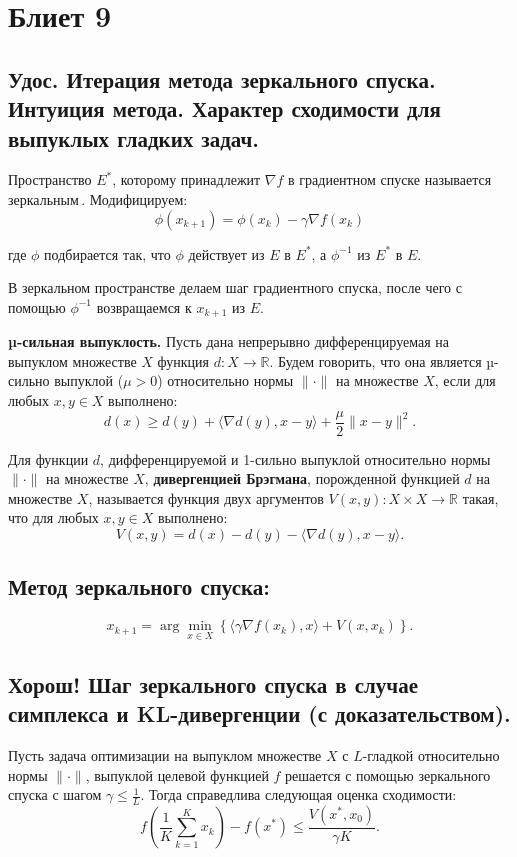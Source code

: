\section{Блиет 9}

\subsection{Удос. Итерация метода зеркального спуска. Интуиция метода. Характер сходимости для выпуклых гладких задач.}

\begin{definition}
    Пространство $E^*$, которому принадлежит $\nabla f$ в градиентном спуске называется \guillemetleft зеркальным\guillemetright \,. Модифицируем:
    $$\phi(x_{k+1}) = \phi(x_k) - \gamma \nabla f(x_k)$$
\end{definition}
где $\phi$ подбирается так, что $\phi$ действует из $E$ в $E^*$, а $\phi^{-1}$ из $E^*$ в $E$.

В зеркальном пространстве делаем шаг градиентного спуска,
после чего с помощью $\phi^{-1}$ возвращаемся к $x_{k+1}$ из $E$.

\begin{definition}
    \textbf{µ-сильная выпуклость.} Пусть дана непрерывно дифференцируемая на выпуклом множестве \( X \) функция
    \( d : X \to \mathbb{R} \). Будем говорить, что она является µ-сильно выпуклой (\( \mu > 0 \)) относительно нормы \( \| \cdot \| \) на множестве \( X \), если для любых \( x, y \in X \) выполнено:
    $$d(x) \geq d(y) + \langle \nabla d(y), x - y \rangle + \frac{\mu}{2} \| x - y \|^2.$$
\end{definition}

\begin{definition}
    Для функции $d$, дифференцируемой и 1-сильно выпуклой относительно нормы $\| \cdot \|$ на множестве $X$,
    \textbf{дивергенцией Брэгмана}, порожденной функцией $d$ на множестве $X$,
    называется функция двух аргументов $V(x, y) : X \times X \to \mathbb{R}$ такая, что для любых $x, y \in X$ выполнено:
    $$V(x, y) = d(x) - d(y) - \langle \nabla d(y), x - y \rangle.$$
\end{definition}

\subsection*{Метод зеркального спуска:}
$$x_{k+1} = \arg \min_{x \in X} \left\{ \langle \gamma \nabla f(x_k), x \rangle + V(x, x_k) \right\}.$$

\subsection{Хорош! Шаг зеркального спуска в случае
    симплекса и KL-дивергенции (с доказательством).}

\begin{theorem}
    Пусть задача оптимизации на выпуклом множестве $X$ с $L$-гладкой относительно нормы $\| \cdot \|$,
    выпуклой целевой функцией $f$ решается с помощью зеркального спуска с шагом $\gamma \leq \frac{1}{L}$.
    Тогда справедлива следующая оценка сходимости:
    $$f\left( \frac{1}{K} \sum_{k=1}^K x_k \right) - f(x^*) \leq \frac{V(x^*, x_0)}{\gamma K}.$$
\end{theorem}
